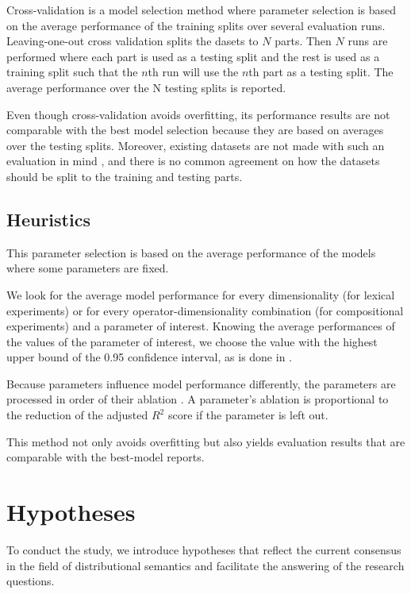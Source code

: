 Cross-validation \cite{Ney1997} is a model selection method where parameter selection is based on the average performance of the training splits over several evaluation runs. Leaving-one-out cross validation splits the dasets to $N$ parts. Then $N$ runs are performed where each part is used as a testing split and the rest is used as a training split such that the $n$th run will use the $n$th part as a testing split. The average performance over the N testing splits is reported.

Even though cross-validation avoids overfitting, its performance results are not comparable with the best model selection because they are based on averages over the testing splits. Moreover, existing datasets are not made with such an evaluation in mind \cite{W16-2506}, and there is no common agreement on how the datasets should be split to the training and testing parts.

\subsection{Heuristics}

This parameter selection is based on the average performance of the models where some parameters are fixed.

We look for the average model performance for every dimensionality (for lexical experiments) or for every operator-dimensionality combination (for compositional experiments) and a parameter of interest. Knowing the average performances of the values of the parameter of interest, we choose the value with the highest upper bound of the 0.95 confidence interval, as is done in .

Because parameters influence model performance differently, the parameters are processed in order of their ablation \cite{lapesa2014large}. A parameter's ablation is proportional to the reduction of the adjusted $R^2$ score if the parameter is left out.

This method not only avoids overfitting but also yields evaluation results that are comparable with the best-model reports.

\section{Hypotheses}
\label{sec:hypotheses}

To conduct the study, we introduce hypotheses that reflect the current consensus in the field of distributional semantics and facilitate the answering of the research questions.

